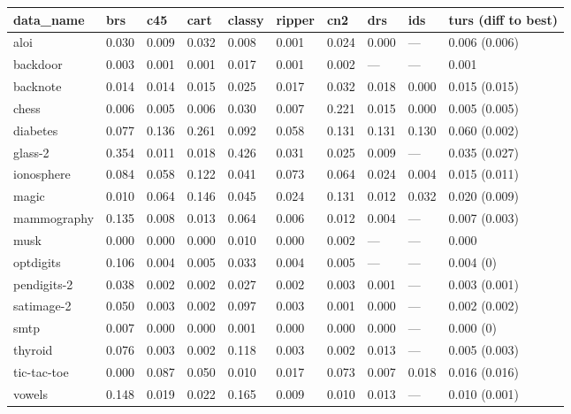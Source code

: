 \begin{table}[ht]
\small
\centering
\begin{tabular}{l|llllllll|l}
  \hline
data\_name & brs & c45 & cart & classy & ripper & cn2 & drs & ids & turs \tiny{(diff to best)} \\ 
  \hline
aloi & 0.030 & 0.009 & 0.032 & 0.008 & 0.001 & 0.024 & 0.000 & --- & 0.006 \tiny{(0.006)} \\ 
  backdoor & 0.003 & 0.001 & 0.001 & 0.017 & 0.001 & 0.002 & --- & --- & 0.001 \\ 
  backnote & 0.014 & 0.014 & 0.015 & 0.025 & 0.017 & 0.032 & 0.018 & 0.000 & 0.015 \tiny{(0.015)} \\ 
  chess & 0.006 & 0.005 & 0.006 & 0.030 & 0.007 & 0.221 & 0.015 & 0.000 & 0.005 \tiny{(0.005)} \\ 
  diabetes & 0.077 & 0.136 & 0.261 & 0.092 & 0.058 & 0.131 & 0.131 & 0.130 & 0.060 \tiny{(0.002)} \\ 
  glass-2 & 0.354 & 0.011 & 0.018 & 0.426 & 0.031 & 0.025 & 0.009 & --- & 0.035 \tiny{(0.027)} \\ 
  ionosphere & 0.084 & 0.058 & 0.122 & 0.041 & 0.073 & 0.064 & 0.024 & 0.004 & 0.015 \tiny{(0.011)} \\ 
  magic & 0.010 & 0.064 & 0.146 & 0.045 & 0.024 & 0.131 & 0.012 & 0.032 & 0.020 \tiny{(0.009)} \\ 
  mammography & 0.135 & 0.008 & 0.013 & 0.064 & 0.006 & 0.012 & 0.004 & --- & 0.007 \tiny{(0.003)} \\ 
  musk & 0.000 & 0.000 & 0.000 & 0.010 & 0.000 & 0.002 & --- & --- & 0.000 \\ 
  optdigits & 0.106 & 0.004 & 0.005 & 0.033 & 0.004 & 0.005 & --- & --- & 0.004 \tiny{(0)} \\ 
  pendigits-2 & 0.038 & 0.002 & 0.002 & 0.027 & 0.002 & 0.003 & 0.001 & --- & 0.003 \tiny{(0.001)} \\ 
  satimage-2 & 0.050 & 0.003 & 0.002 & 0.097 & 0.003 & 0.001 & 0.000 & --- & 0.002 \tiny{(0.002)} \\ 
  smtp & 0.007 & 0.000 & 0.000 & 0.001 & 0.000 & 0.000 & 0.000 & --- & 0.000 \tiny{(0)} \\ 
  thyroid & 0.076 & 0.003 & 0.002 & 0.118 & 0.003 & 0.002 & 0.013 & --- & 0.005 \tiny{(0.003)} \\ 
  tic-tac-toe & 0.000 & 0.087 & 0.050 & 0.010 & 0.017 & 0.073 & 0.007 & 0.018 & 0.016 \tiny{(0.016)} \\ 
  vowels & 0.148 & 0.019 & 0.022 & 0.165 & 0.009 & 0.010 & 0.013 & --- & 0.010 \tiny{(0.001)} \\ 

\end{tabular}
\end{table}
